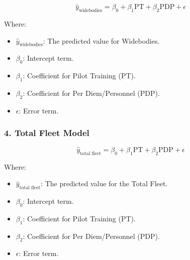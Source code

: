 \begin{equation}
    \hat{y}_{\text{widebodies}} = \beta_0 + \beta_1 \text{PT} + \beta_2 \text{PDP} + \epsilon
\end{equation}

Where:
\begin{itemize}
    \item \(\hat{y}_{\text{widebodies}}\): The predicted value for Widebodies.
    \item \(\beta_0\): Intercept term.
    \item \(\beta_1\): Coefficient for Pilot Training (PT).
    \item \(\beta_2\): Coefficient for Per Diem/Personnel (PDP).
    \item \(\epsilon\): Error term.
\end{itemize}

\subsubsection{4. Total Fleet Model}


\begin{equation}
    \hat{y}_{\text{total fleet}} = \beta_0 + \beta_1 \text{PT} + \beta_2 \text{PDP} + \epsilon
\end{equation}

Where:
\begin{itemize}
    \item \(\hat{y}_{\text{total fleet}}\): The predicted value for the Total Fleet.
    \item \(\beta_0\): Intercept term.
    \item \(\beta_1\): Coefficient for Pilot Training (PT).
    \item \(\beta_2\): Coefficient for Per Diem/Personnel (PDP).
    \item \(\epsilon\): Error term.
\end{itemize}